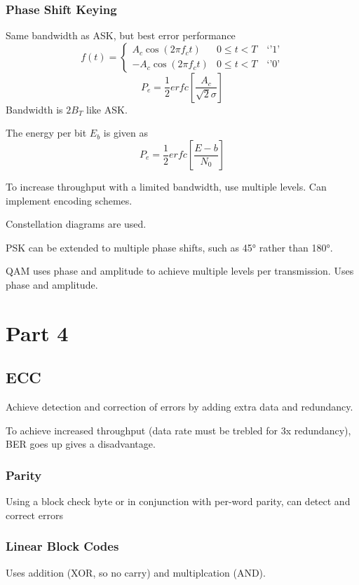\documentclass[a4paper,twocolumn]{article}
\begin{document}
			\subsubsection{Phase Shift Keying}
				Same bandwidth as ASK, but best error performance
				\begin{equation}
					f(t) = \begin{cases}
						A_c\cos(2\pi f_ct) & 0\le t < T \quad \text{`'1'}\\
						-A_c\cos(2\pi f_ct) & 0\le t < T \quad \text{`'0'}
								\end{cases}
				\end{equation}
				\begin{equation}
					P_e = \frac{1}{2} erfc \left[ \frac{A_c}{\sqrt{2}\sigma}\right]
				\end{equation}
				Bandwidth is $2B_T$ like ASK.

				The energy per bit $E_b$ is given as
				\begin{equation}
					P_e = \frac{1}{2} erfc \left[ \frac{E-b}{N_0}\right]
				\end{equation}

		To increase throughput with a limited bandwidth, use multiple levels. Can implement  encoding schemes.

		Constellation diagrams are used.

		PSK can be extended to multiple phase shifts, such as \ang{45} rather than \ang{180}.

		QAM uses phase and amplitude to achieve multiple levels per transmission. Uses phase and amplitude.
	\section{Part 4}
		\subsection{ECC}
			Achieve detection and correction of errors by adding extra data and redundancy.

			To achieve increased throughput (data rate must be trebled for 3x redundancy), BER goes up gives a disadvantage.

			\subsubsection{Parity}
				Using a block check byte or in conjunction with per-word parity, can detect and correct errors

			\subsubsection{Linear Block Codes}
				Uses addition (XOR, so no carry) and multiplcation (AND).
\end{document}
